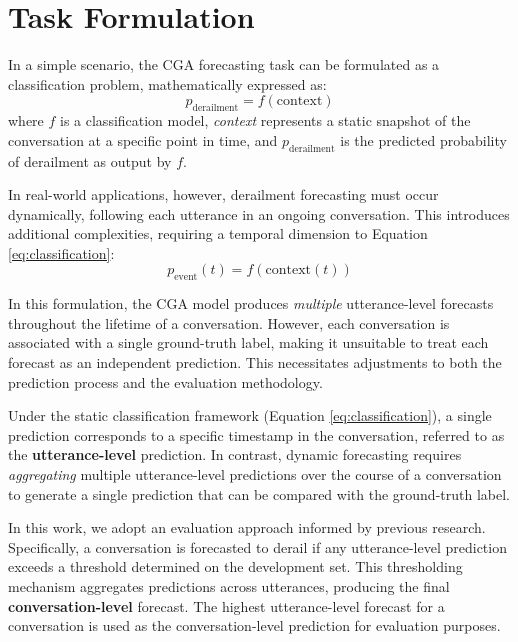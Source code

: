 \section{Task Formulation}
In a simple scenario, the CGA forecasting task can be formulated as a classification problem, mathematically expressed as:
\begin{equation}
p_{\mathrm{derailment}} = f(\mathrm{context})
\label{eq:classification}
\end{equation}
where $f$ is a classification model, \emph{context} represents a static snapshot of the conversation at a specific point in time, and $p_{\mathrm{derailment}}$ is the predicted probability of derailment as output by $f$.

In real-world applications, however, derailment forecasting must occur dynamically, following each utterance in an ongoing conversation. This introduces additional complexities, requiring a temporal dimension to Equation \ref{eq:classification}:
\begin{equation}
p_{\mathrm{event}}(t) = f(\mathrm{context}(t))
\label{eq:forecastingmodel}
\end{equation}

In this formulation, the CGA model produces \emph{multiple} utterance-level forecasts throughout the lifetime of a conversation. However, each conversation is associated with a single ground-truth label, making it unsuitable to treat each forecast as an independent prediction. This necessitates adjustments to both the prediction process and the evaluation methodology.

Under the static classification framework (Equation \ref{eq:classification}), a single prediction corresponds to a specific timestamp in the conversation, referred to as the \textbf{utterance-level} prediction. In contrast, dynamic forecasting requires \emph{aggregating} multiple utterance-level predictions over the course of a conversation to generate a single prediction that can be compared with the ground-truth label.

In this work, we adopt an evaluation approach informed by previous research. Specifically, a conversation is forecasted to derail if any utterance-level prediction exceeds a threshold determined on the development set. This thresholding mechanism aggregates predictions across utterances, producing the final \textbf{conversation-level} forecast. The highest utterance-level forecast for a conversation is used as the conversation-level prediction for evaluation purposes.